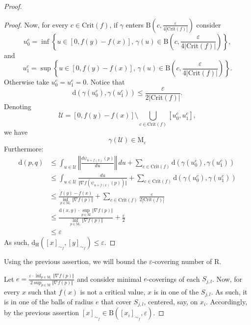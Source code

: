 \documentclass[pdflatex,sn-mathphys-ay]{sn-jnl}%
\newcommand{\reeb}{\mathrm{R}}
\newcommand{\man}{\mathrm{M}}
\newcommand{\dis}{\mathrm{d}}
\newcommand{\critic}{{\mathrm {Crit}}}
\newcommand{\haus}{{\mathrm {d_H}}}
\newcommand{\ball}{{\mathrm {B}}}
\newcommand{\eps}{\varepsilon}
\theoremstyle{thmstyleone}%
\begin{document}
\begin{proof}
\begin{proof}
Now, for every $c\in\critic(f)$, if $\gamma$ enters $\ball\left(c,\frac{\eps}{4\left|\critic(f)\right|}\right)$ consider 
$$u^c_0=\inf\left\{u\in[0,f(y)-f(x)],\,\gamma(u)\in \ball\left(c,\frac{\eps}{4\left|\critic(f)\right|}\right)\right\},$$
and 
$$u^c_1=\sup\left\{u\in[0,f(y)-f(x)],\,\gamma(u)\in \ball\left(c,\frac{\eps}{4\left|\critic(f)\right|}\right)\right\}.$$
Otherwise take $u^c_0=u^c_1=0$.
Notice that
$$\dis(\gamma(u^c_0),\gamma(u^c_1))\leq \frac{\eps}{2\left|\critic(f)\right|}.$$
Denoting
 $$\mathcal{U}=[0,f(y)-f(x)]\setminus\bigcup_{c \in \critic(f)}[u^c_0,u^c_1],$$
 we have 
 $$\gamma\left(\mathcal{U}\right)\in\man_\eps$$
 Furthermore:
\begin{align*}
\dis(p,q)&\leq\int_{u\in \mathcal{U}}\left\Vert\frac{d\psi_{u+f(x)}(p)}{du}\right\Vert\,du + \sum_{c \in \critic(f)} \dis(\gamma(u^c_0),\gamma(u^c_1))\\
&\leq\int_{u\in \mathcal{U}}\frac{du}{\Vert\nabla f(\psi_{u+f(x)}(p))\Vert} + \sum_{c \in \critic(f)} \dis(\gamma(u^c_0),\gamma(u^c_1))\\
&\leq\frac{f(y)-f(x)}{\inf_{p\in\man_\eps}\Vert\nabla f(p)\Vert}+ \sum_{c \in \critic(f)} \frac{\eps}{2\left|\critic(f)\right|}\\
&\leq\frac{\dis(x,y)\cdot \sup_{p\in\man}\Vert\nabla f(p)\Vert}{\inf_{p\in\man_\eps}\Vert\nabla f(p)\Vert}+\frac{\eps}{2}\\
&\leq\eps
\end{align*}
 As such, $\haus([x]_{\sim_f},[y]_{\sim_f})\leq\eps$.
 \end{proof}
 
 Using the previous assertion, we will bound the $\eps$-covering number of $\reeb$.
 
Let $e=\frac{\eps\cdot \inf_{p\in\man_\eps}\Vert\nabla f(p)\Vert}{2\sup_{p\in\man}\Vert\nabla f(p)\Vert}$ and consider minimal $e$-coverings of each $S_{j,l}$.
%
Now, for every $x$ such that $f(x)$ is not a critical value, $x$ is in one of the $S_{j,l}$. As such, it is in one of the balls of radius $e$ that cover $S_{j,l}$, centered, say, on $x_i$. Accordingly, by the previous assertion $[x]_{\sim_f}\in\ball\left([x_i]_{\sim_f},\eps\right)$.


\end{proof}
\end{document}

